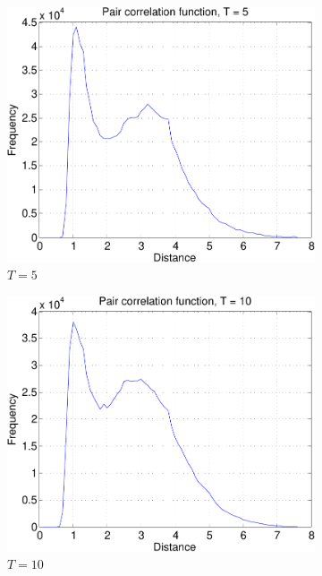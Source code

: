 \documentclass[10pt,a4paper]{article}
\begin{document}
\begin{figure}[ht!]
  \begin{subfigure}[b]{0.3\linewidth}
  \includegraphics[width=\textwidth]{figs/pair_corr_Teq5-crop.pdf}
  \caption{$T=5$}
  \label{fig:pcorr5}
 \end{subfigure}
 \begin{subfigure}[b]{0.3\linewidth}
  \includegraphics[width=\textwidth]{figs/pair_corr_Teq10-crop.pdf}
  \caption{$T=10$}
  \label{fig:pcorr10}
 \end{subfigure}
 \begin{subfigure}[b]{0.3\linewidth}

\end{subfigure}
\end{figure}
\end{document}
